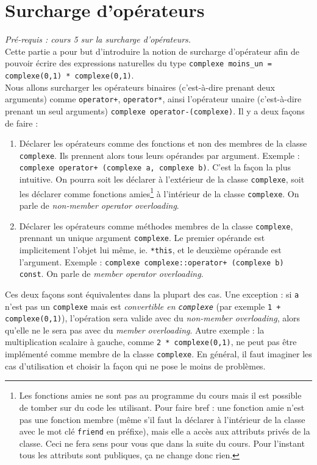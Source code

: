 \documentclass{book}
\newcommand{\inline}[1]{\texttt{#1}}
\begin{document}

\section{Surcharge d'opérateurs}

\emph{Pré-requis : cours 5 sur la surcharge d'opérateurs.}\\

Cette partie a pour but d'introduire la notion de surcharge d'opérateur afin de pouvoir écrire des expressions naturelles du type \inline{complexe moins_un = complexe(0,1) * complexe(0,1)}.\\

Nous allons surcharger les opérateurs binaires (c'est-à-dire prenant deux arguments) comme \inline{operator+}, \inline{operator*}, ainsi l'opérateur unaire (c'est-à-dire prenant un seul arguments) \inline{complexe operator-(complexe)}. Il y a deux façons de faire :
\begin{enumerate}
\item Déclarer les opérateurs comme des fonctions et non des membres de la classe \texttt{complexe}. Ils prennent alors tous leurs opérandes par argument. Exemple : \inline{complexe operator+ (complexe a, complexe b)}. C'est la façon la plus intuitive. On pourra soit les déclarer à l'extérieur de la classe \inline{complexe}, soit les déclarer comme fonctions amies\footnote{Les fonctions amies ne sont pas au programme du cours mais il est possible de tomber sur du code les utilisant. Pour faire bref : une fonction amie n'est pas une fonction membre (même s'il faut la déclarer à l'intérieur de la classe avec le mot clé \inline{friend} en préfixe), mais elle a accès aux attributs privés de la classe. Ceci ne fera sens pour vous que dans la suite du cours. Pour l'instant tous les attributs sont publiques, ça ne change donc rien.} à l'intérieur de la classe \inline{complexe}. On parle de \textit{non-member operator overloading}.
\item Déclarer les opérateurs comme méthodes membres de la classe \texttt{complexe}, prennant un unique argument \texttt{complexe}. Le premier opérande est implicitement l'objet lui même, ie. \inline{*this}, et le deuxième opérande est l'argument. Exemple : \inline{complexe complexe::operator+ (complexe b) const}. On parle de \textit{member operator overloading}.
\end{enumerate}
Ces deux façons sont équivalentes dans la plupart des cas. Une exception : si \texttt{a} n'est pas un \texttt{complexe} mais est \emph{convertible en \texttt{complexe}} (par exemple \inline{1 + complexe(0,1)}), l'opération sera valide avec du \textit{non-member overloading}, alors qu'elle ne le sera pas avec du \textit{member overloading}. Autre exemple : la multiplication scalaire à gauche, comme \inline{2 * complexe(0,1)}, ne peut pas être implémenté comme membre de la classe \texttt{complexe}. En général, il faut imaginer les cas d'utilisation et choisir la façon qui ne pose le moins de problèmes.\\
\end{document}
